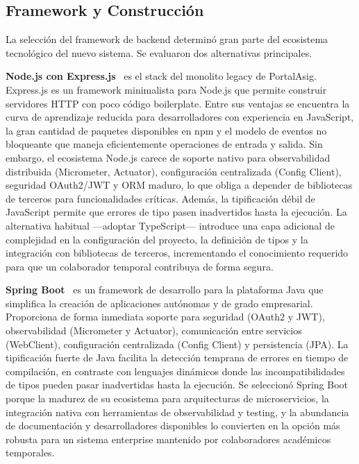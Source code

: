 \subsection{Framework y Construcci\'{o}n}

La selecci\'{o}n del framework de backend determin\'{o} gran parte del ecosistema tecnol\'{o}gico del nuevo sistema. Se evaluaron dos alternativas principales.

\textbf{Node.js con Express.js}~\cite{express2024} es el stack del monolito legacy de PortalAsig. Express.js es un framework minimalista para Node.js que permite construir servidores HTTP con poco c\'{o}digo boilerplate. Entre sus ventajas se encuentra la curva de aprendizaje reducida para desarrolladores con experiencia en JavaScript, la gran cantidad de paquetes disponibles en npm y el modelo de eventos no bloqueante que maneja eficientemente operaciones de entrada y salida. Sin embargo, el ecosistema Node.js carece de soporte nativo para observabilidad distribuida (Micrometer, Actuator), configuraci\'{o}n centralizada (Config Client), seguridad OAuth2/JWT y ORM maduro, lo que obliga a depender de bibliotecas de terceros para funcionalidades cr\'{i}ticas. Adem\'{a}s, la tipificaci\'{o}n d\'{e}bil de JavaScript permite que errores de tipo pasen inadvertidos hasta la ejecuci\'{o}n. La alternativa habitual ---adoptar TypeScript--- introduce una capa adicional de complejidad en la configuraci\'{o}n del proyecto, la definici\'{o}n de tipos y la integraci\'{o}n con bibliotecas de terceros, incrementando el conocimiento requerido para que un colaborador temporal contribuya de forma segura.

\textbf{Spring Boot}~\cite{springboot2024} es un framework de desarrollo para la plataforma Java que simplifica la creaci\'{o}n de aplicaciones aut\'{o}nomas y de grado empresarial. Proporciona de forma inmediata soporte para seguridad (OAuth2 y JWT), observabilidad (Micrometer y Actuator), comunicaci\'{o}n entre servicios (WebClient), configuraci\'{o}n centralizada (Config Client) y persistencia (JPA). La tipificaci\'{o}n fuerte de Java facilita la detecci\'{o}n temprana de errores en tiempo de compilaci\'{o}n, en contraste con lenguajes din\'{a}micos donde las incompatibilidades de tipos pueden pasar inadvertidas hasta la ejecuci\'{o}n. Se seleccion\'{o} Spring Boot porque la madurez de su ecosistema para arquitecturas de microservicios, la integraci\'{o}n nativa con herramientas de observabilidad y testing, y la abundancia de documentaci\'{o}n y desarrolladores disponibles lo convierten en la opci\'{o}n m\'{a}s robusta para un sistema enterprise mantenido por colaboradores acad\'{e}micos temporales.

